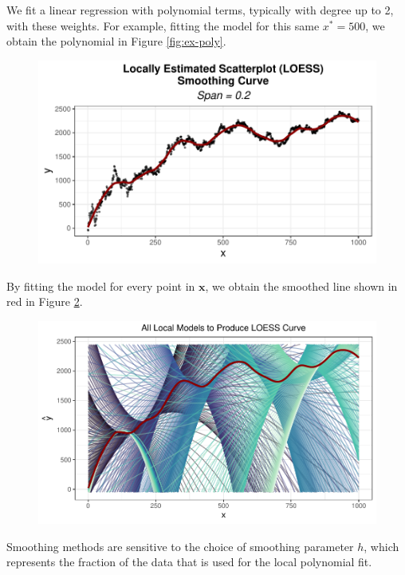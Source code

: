 \documentclass[12pt,twoside]{smiththesis}
\begin{document}
We fit a linear regression with polynomial terms, typically with degree up to 2, with these weights. For example, fitting the model for this same \(x^*=500\), we obtain the polynomial in Figure \ref{fig:ex-poly}.
\begin{flushleft}
\begin{figure}

{\centering \includegraphics{thesis_files/figure-latex/unnamed-chunk-29-1} 

}

\caption{\label{fig:ex-poly}}\label{fig:unnamed-chunk-29}
\end{figure}
\end{flushleft}
By fitting the model for every point in \(\mathbf x\), we obtain the smoothed line shown in red in Figure \ref{fig:loess-all}.
\begin{figure}

{\centering \includegraphics{thesis_files/figure-latex/loess-all-1} 

}

\caption{\label{loess-all}}\label{fig:loess-all}
\end{figure}
Smoothing methods are sensitive to the choice of smoothing parameter \(h\), which represents the fraction of the data that is used for the local polynomial fit.
\end{document}
